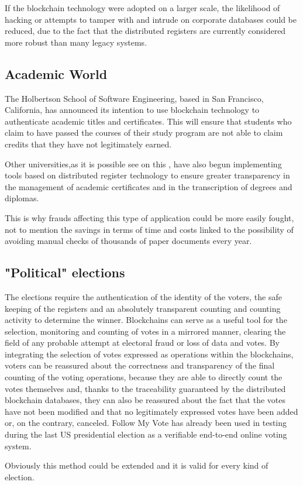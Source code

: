 \documentclass{article}
\begin{document}
        If the blockchain technology were adopted on a larger scale, the likelihood of hacking or attempts to tamper with and intrude on corporate databases could be reduced, due to the fact that the distributed registers are currently considered more robust than many legacy systems. 
        
    \subsection{Academic World}
        The Holbertson School of Software Engineering, based in San Francisco, California, has announced its intention to use blockchain technology to authenticate academic titles and certificates\cite{Holberton}.
        This will ensure that students who claim to have passed the courses of their study program are not able to claim credits that they have not legitimately earned.
        
        Other universities,as it is possible see on this \cite{unic}, have also begun implementing tools based on distributed register technology to ensure greater transparency in the management of academic certificates and in the transcription of degrees and diplomas.
        
        This is why frauds affecting this type of application could be more easily fought, not to mention the savings in terms of time and costs linked to the possibility of avoiding manual checks of thousands of paper documents every year.
        
    \subsection{"Political" elections}
        The elections require the authentication of the identity of the voters, the safe keeping of the registers and an absolutely transparent counting and counting activity to determine the winner. Blockchains can serve as a useful tool for the selection, monitoring and counting of votes in a mirrored manner, clearing the field of any probable attempt at electoral fraud or loss of data and votes. By integrating the selection of votes expressed as operations within the blockchains, voters can be reassured about the correctness and transparency of the final counting of the voting operations, because they are able to directly count the votes themselves and, thanks to the traceability guaranteed by the distributed blockchain databases, they can also be reassured about the fact that the votes have not been modified and that no legitimately expressed votes have been added or, on the contrary, canceled. Follow My Vote has already been used in testing during the last US presidential election as a verifiable end-to-end online voting system. \cite{followmyvote}
        
        Obviously this method could be extended and it is valid for every kind of election.

  

\end{document}
